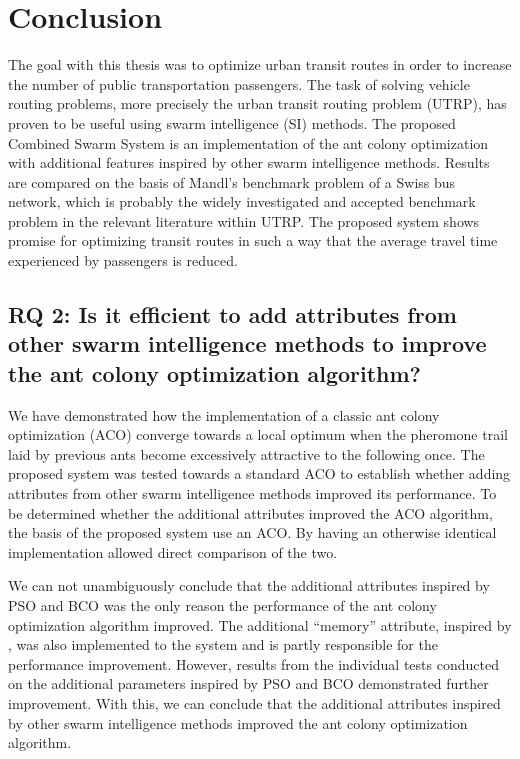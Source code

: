 \section{Conclusion}

The goal with this thesis was to optimize urban transit routes in order to increase the number of public transportation passengers. The task of solving vehicle routing problems, more precisely the urban transit routing problem (UTRP), has proven to be useful using swarm intelligence (SI) methods. The proposed Combined Swarm System is an implementation of the ant colony optimization with additional features inspired by other swarm intelligence methods. Results are compared on the basis of Mandl's benchmark problem of a Swiss bus network, which is probably the widely investigated and accepted benchmark problem in the relevant literature within UTRP. The proposed system shows promise for optimizing transit routes in such a way that the average travel time experienced by passengers is reduced. 

\subsection*{RQ 2: Is it efficient to add attributes from other swarm intelligence methods to improve the ant colony optimization algorithm?}

We have demonstrated how the implementation of a classic ant colony optimization (ACO) converge towards a local optimum when the pheromone trail laid by previous ants become excessively attractive to the following once. The proposed system was tested towards a standard ACO to establish whether adding attributes from other swarm intelligence methods improved its performance. To be determined whether the additional attributes improved the ACO algorithm, the basis of the proposed system use an ACO. By having an otherwise identical implementation allowed direct comparison of the two. %
\newline

We can not unambiguously conclude that the additional attributes inspired by PSO and BCO was the only reason the performance of the ant colony optimization algorithm improved. The additional ``memory'' attribute, inspired by \citet{dorigo96, sedighpour14, poorzahedy11, salehinejad10}, was also implemented to the system and is partly responsible for the performance improvement. However, results from the individual tests conducted on the additional parameters inspired by PSO and BCO demonstrated further improvement. With this, we can conclude that the additional attributes inspired by other swarm intelligence methods improved the ant colony optimization algorithm. 

